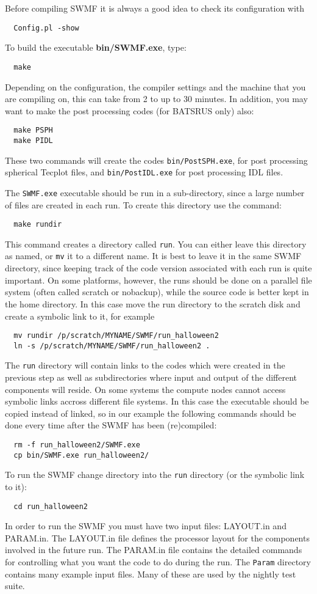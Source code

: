 Before compiling SWMF it is always a good idea to check its configuration
with
\begin{verbatim}
  Config.pl -show
\end{verbatim}

To build the executable {\bf bin/SWMF.exe}, type:
\begin{verbatim}
  make
\end{verbatim} 
Depending on the configuration, the compiler settings and the machine 
that you are compiling on, this can take from 2 to up to 30 minutes.  
In addition, you may want to make the post processing
codes (for BATSRUS only) also:
\begin{verbatim}
  make PSPH
  make PIDL
\end{verbatim} 
These two commands will create the codes {\tt bin/PostSPH.exe}, for post
processing spherical Tecplot files, and {\tt bin/PostIDL.exe} 
for post processing IDL files.

The {\tt SWMF.exe} executable should be run in a sub-directory, 
since a large number of files are created in each run.  
To create this directory use the command:
\begin{verbatim}
  make rundir
\end{verbatim} 
This command creates a directory called {\tt run}.  You can either
leave this directory as named, or {\tt mv} it to a different name.  It
is best to leave it in the same SWMF directory, since
keeping track of the code version associated with each run is quite
important. On some platforms, however, the runs should be done on a
parallel file system (often called scratch or nobackup), while the
source code is better kept in the home directory. In this case move
the run directory to the scratch disk and create a symbolic link to it, 
for example
\begin{verbatim}
  mv rundir /p/scratch/MYNAME/SWMF/run_halloween2
  ln -s /p/scratch/MYNAME/SWMF/run_halloween2 .
\end{verbatim}
The {\tt run} directory will contain links to the codes
which were created in the previous step as well as subdirectories
where input and output of the different components will reside.
On some systems the compute nodes cannot access symbolic links
accross different file systems. In this case the executable should be 
copied instead of linked, so in our example the following commands
should be done every time after the SWMF has been (re)compiled:
\begin{verbatim}
  rm -f run_halloween2/SWMF.exe
  cp bin/SWMF.exe run_halloween2/
\end{verbatim}
To run the SWMF change directory into the {\tt run} directory 
(or the symbolic link to it):
\begin{verbatim}
  cd run_halloween2
\end{verbatim}
In order to run the SWMF you must have two input files:  LAYOUT.in and
PARAM.in.  The LAYOUT.in file defines the processor
layout for the components involved in the future run.  The PARAM.in
file contains the detailed commands for controlling what you want the
code to do during the run.  The {\tt Param} directory contains many
example input files. Many of these are used by the nightly test suite.

